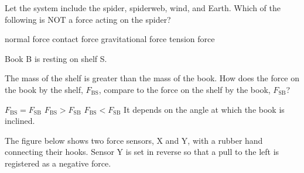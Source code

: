 \documentclass[]{exam}
\begin{document}
\begin{questions}
Let the system include the spider, spiderweb, wind, and Earth. Which of the following is NOT a force acting on the spider?

\begin{randomizeoneparchoices}
    \correctchoice normal force
    \choice contact force
    \choice gravitational force
    \choice tension force
\end{randomizeoneparchoices}

\question
Book B is resting on shelf S. 

\begin{center}
\end{center}

The mass of the shelf is greater than the mass of the book. How does the force on the book by the shelf, $F_{\mathrm{BS}}$, compare to the force on the shelf by the book, $F_\mathrm{SB}$?

\begin{randomizechoices}[keeplast]
    \correctchoice $F_\mathrm{BS} = F_\mathrm{SB}$
    \choice $F_\mathrm{BS} > F_\mathrm{SB}$
    \choice $F_\mathrm{BS} < F_\mathrm{SB}$
    \choice It depends on the angle at which the book is inclined. 
\end{randomizechoices}

\question
The figure below shows two force sensors, X and Y, with a rubber hand connecting their hooks. Sensor Y is set in reverse so that a pull to the left is registered as a negative force. 

\begin{center}
\end{center}


\end{questions}
\end{document}
